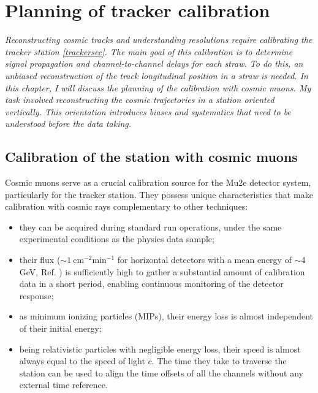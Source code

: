 \chapter{Planning of tracker calibration}
\textit{Reconstructing cosmic tracks and understanding resolutions require calibrating the tracker station \ref{trackersec}. 
The main goal of this calibration is to determine signal propagation and channel-to-channel delays for each straw. 
To do this, an unbiased reconstruction of the track longitudinal position in a straw is needed.
In this chapter, I will discuss the planning of the calibration with cosmic muons. My task involved reconstructing 
the cosmic trajectories in a station oriented vertically. This orientation introduces biases and systematics that 
need to be understood before the data taking.  }
\section{Calibration of the station with cosmic muons}
Cosmic muons serve as a crucial calibration source for the Mu2e detector system, particularly for the tracker station. 
They possess unique characteristics that make calibration with cosmic rays complementary to other techniques:
\begin{itemize}
    \item they can be acquired during standard run operations, under the same experimental conditions as the physics data sample;
    \item their flux ($\sim 1 \ \text{cm}^{-2} \text{min}^{-1}$ for horizontal detectors with a mean
    energy of $\sim$4 GeV, Ref. \cite{muonflux}) is sufficiently high to gather a substantial amount of calibration data in a short period, 
    enabling continuous monitoring of the detector response;
    \item as minimum ionizing particles (MIPs), their energy loss is almost independent of their initial energy;
    \item being relativistic particles with negligible energy loss, their speed is almost always equal to the speed of 
    light $c$. The time they take to traverse the station can be used to align the time offsets of all the channels without any external time reference.
\end{itemize}
